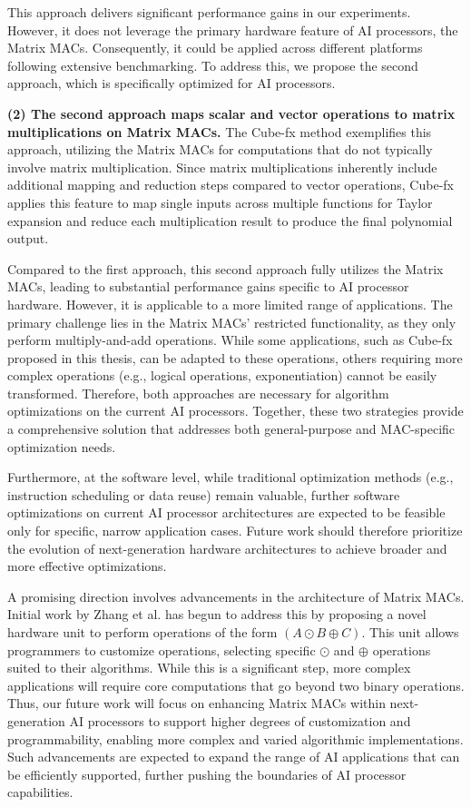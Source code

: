 This approach delivers significant performance gains in our experiments. However, it does not leverage the primary hardware feature of AI processors, the Matrix MACs. Consequently, it could be applied across different platforms following extensive benchmarking. To address this, we propose the second approach, which is specifically optimized for AI processors.

\textbf{(2) The second approach maps scalar and vector operations to matrix multiplications on Matrix MACs.}
The Cube-fx method exemplifies this approach, utilizing the Matrix MACs for computations that do not typically involve matrix multiplication. Since matrix multiplications inherently include additional mapping and reduction steps compared to vector operations, Cube-fx applies this feature to map single inputs across multiple functions for Taylor expansion and reduce each multiplication result to produce the final polynomial output.

Compared to the first approach, this second approach fully utilizes the Matrix MACs, leading to substantial performance gains specific to AI processor hardware. However, it is applicable to a more limited range of applications. The primary challenge lies in the Matrix MACs' restricted functionality, as they only perform multiply-and-add operations. While some applications, such as Cube-fx proposed in this thesis, can be adapted to these operations, others requiring more complex operations (e.g., logical operations, exponentiation) cannot be easily transformed. Therefore, both approaches are necessary for algorithm optimizations on the current AI processors. Together, these two strategies provide a comprehensive solution that addresses both general-purpose and MAC-specific optimization needs.

Furthermore, at the software level, while traditional optimization methods (e.g., instruction scheduling or data reuse) remain valuable, further software optimizations on current AI processor architectures are expected to be feasible only for specific, narrow application cases. Future work should therefore prioritize the evolution of next-generation hardware architectures to achieve broader and more effective optimizations.

A promising direction involves advancements in the architecture of Matrix MACs. Initial work by Zhang et al. \cite{10.1145/3470496.3527411} has begun to address this by proposing a novel hardware unit to perform operations of the form $(A \odot B \oplus C)$. This unit allows programmers to customize operations, selecting specific $\odot$ and $\oplus$ operations suited to their algorithms. While this is a significant step, more complex applications will require core computations that go beyond two binary operations. Thus, our future work will focus on enhancing Matrix MACs within next-generation AI processors to support higher degrees of customization and programmability, enabling more complex and varied algorithmic implementations. Such advancements are expected to expand the range of AI applications that can be efficiently supported, further pushing the boundaries of AI processor capabilities.

